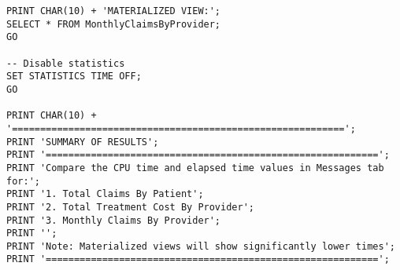 \begin{lstlisting}[style=sqlstyle, caption={Materialized view creation}, label=lst:Analysis]
PRINT CHAR(10) + 'MATERIALIZED VIEW:';
SELECT * FROM MonthlyClaimsByProvider;
GO

-- Disable statistics
SET STATISTICS TIME OFF;
GO

PRINT CHAR(10) + '===========================================================';
PRINT 'SUMMARY OF RESULTS';
PRINT '===========================================================';
PRINT 'Compare the CPU time and elapsed time values in Messages tab for:';
PRINT '1. Total Claims By Patient';
PRINT '2. Total Treatment Cost By Provider';
PRINT '3. Monthly Claims By Provider';
PRINT '';
PRINT 'Note: Materialized views will show significantly lower times';
PRINT '===========================================================';
\end{lstlisting}